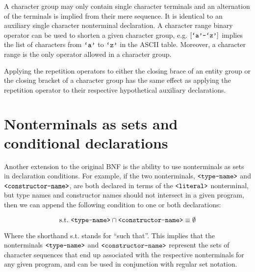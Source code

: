 A character group may only contain single character terminals and an
alternation of the terminals is implied from their mere sequence. It is
identical to an auxiliary single character nonterminal declaration. A character
range binary operator can be used to shorten a given character group, e.g.
$[\text{{\ttfamily`a'}}\text{{\ttfamily-}}\text{{\ttfamily`z'}}]$ implies the list of characters from $\text{{\ttfamily`a'}}$
to $\text{{\ttfamily`z'}}$ in the ASCII table.  Moreover, a character range is the only
operator allowed in a character group.

Applying the repetition operators to either the closing brace of an entity
group or the closing bracket of a character group has the same effect as
applying the repetition operator to their respective hypothetical auxiliary
declarations.

\section{Nonterminals as sets and conditional declarations}

Another extension to the original BNF is the ability to use nonterminals as
sets in declaration conditions. For example, if the two nonterminals,
$\text{{\ttfamily<type-name>}}$ and $\text{{\ttfamily<constructor-name>}}$, are both declared in
terms of the $\text{{\ttfamily<literal>}}$ nonterminal, but type names and constructor
names should not intersect in a given program, then we can append the following
condition to one or both declarations:

$$\text{s.t.}\
\text{{\ttfamily<type-name>}}\cap\text{{\ttfamily<constructor-name>}}\equiv\emptyset$$

Where the shorthand s.t. stands for ``such that''. This implies that the
nonterminals $\text{{\ttfamily<type-name>}}$ and $\text{{\ttfamily<constructor-name>}}$ represent
the sets of character sequences that end up associated with the respective
nonterminals for any given program, and can be used in conjunction with regular
set notation.
